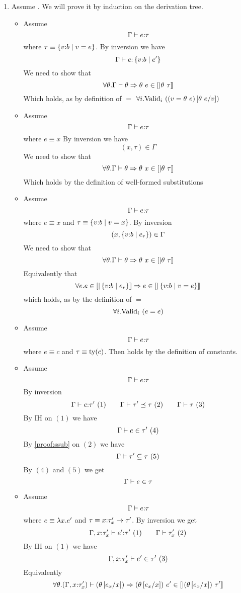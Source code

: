 \begin{enumerate}
\item Assume . 
We will prove it by induction on the derivation tree.

\begin{itemize}
\item \rtexact Assume
$$\hastype{\Gamma}{e}{\tau}$$
where $\tau \equiv \tref{v}{b}{v = e}$.
By inversion we have
$$\hastype{\Gamma}{e}{\tref{v}{b}{e'}}$$
We need to show that 
$$	\forall \theta . \iswellformed{\Gamma}{\theta} \Rightarrow \theta\ e \in \interp{\theta \ \tau}$$
Which holds, as by definition of $=$
$\generalconditionImplOne{(v = \theta\ e)\sub{v}{\theta\ e}}$
\item\rtvar Assume
$$	\hastype{\Gamma}{e}{\tau}$$
where $e \equiv x$
By inversion we have
$$(x,\tau) \in \Gamma$$
We need to show that 
$$	\forall \theta . \iswellformed{\Gamma}{\theta} \Rightarrow \theta\ x \in \interp{\theta \ \tau}$$
Which holds by the definition of well-formed substitutions
\item\rtvarbase Assume
$$\hastype{\Gamma}{e}{\tau}$$
where $e\equiv x$ and $\tau\equiv\tref{v}{b}{v=x}$.
By inversion
$$(x,\tref{v}{b}{e_r}) \in \Gamma$$ 
We need to show that 
$$	\forall \theta . \iswellformed{\Gamma}{\theta} \Rightarrow \theta\ x \in \interp{\theta \ \tau}$$
Equivalently that 
$$\forall e.
 e\in\interp{\tref{v}{b}{e_r}} \Rightarrow e \in \interp{\tref{v}{b}{v = e}}$$
which holds, as by the definition of $=$
$$\generalconditionImplOne{e=e}$$
\item\rtconst Assume
$$\hastype{\Gamma}{e}{\tau}$$
where $e \equiv c$ and $\tau\equiv\ty{c}$.
Then  holds by the definition of constants.
\item\rtsub Assume 
$$	\hastype{\Gamma}{e}{\tau}$$
By inversion
$$
	\hastype{\Gamma}{e}{\tau'}\ (1) \qquad
	\issubtype{\Gamma}{\tau'}{\tau}\ (2) \qquad
	\iswellformed{\Gamma}{\tau}\ (3)
$$
By IH on $(1)$ we have
$$	\shastype{\Gamma}{e}{\tau'}\ (4)$$
By \ref{proof:ssub} on $(2)$ we have
$$	\sissubtype{\Gamma}{\tau'}{\tau}\ (5)$$
By $(4)$ and $(5)$ we get
$$	\shastype{\Gamma}{e}{\tau}$$
\item\rtfun Assume
$$	\hastype{\Gamma}{e}{\tau}$$
where $e \equiv \efun{x}{e'}$ and 
$\tau \equiv\tfun{x}{\tau'_x}{\tau'}$.
By inversion we get
$$
	\hastype{\Gamma, x\colon\tau'_x}{e'}{\tau'}\ (1) \qquad
	\iswellformed{\Gamma}{\tau'_x}\ (2)
$$
By IH on $(1)$ we have
$$
	\shastype{\Gamma, x\colon\tau'_x}{e'}{\tau'}\ (3)
$$
Equivalently
$$	
\forall \theta . \iswellformed{(\Gamma,x\colon\tau'_x)}{(\theta\sub{x}{e_x})} 
	\Rightarrow (\theta\sub{x}{e_x})\ e' \in \interp{(\theta\sub{x}{e_x}) \ \tau'}\\
$$
\end{itemize}
\end{enumerate}
